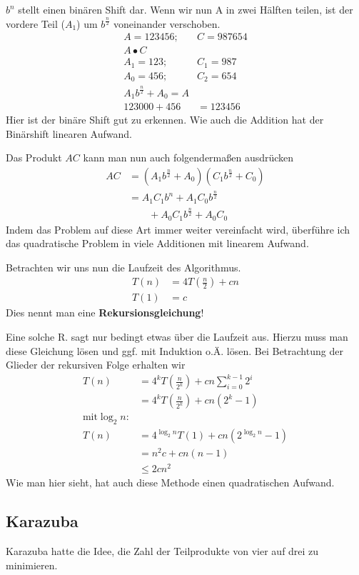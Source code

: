 $b^n$ stellt einen binären Shift dar. Wenn wir nun A in zwei Hälften teilen, ist der vordere Teil ($A_1$) um $b^\frac{n}{2}$ voneinander verschoben.
\begin{eqnarray*}
A=123456;&C=987654\\
A\bullet C&\\
A_1=123;&C_1=987\\
A_0=456;&C_2=654\\
A_1b^\frac{n}{2}+A_0=A\\
123000+456&=123456
\end{eqnarray*}
Hier ist der binäre Shift gut zu erkennen. Wie auch die Addition hat der Binärshift linearen \linebreak Aufwand.

Das Produkt $AC$ kann man nun auch folgendermaßen ausdrücken
\begin{align*}
AC&=(A_1b^{\frac{n}{2}}+A_0)(C_1b^{\frac{n}{2}}+C_0)\\
&=A_1C_1b^n+A_1C_0b^{\frac{n}{2}}\\
&\qquad {}+A_0C_1b^\frac{n}{2}+A_0C_0
\end{align*}
Indem das Problem auf diese Art immer weiter vereinfacht wird, überführe ich das quadratische Problem in viele Additionen mit linearem Aufwand.

Betrachten wir uns nun die Laufzeit des Algorithmus. 
\begin{align*}
T(n)&=4T\left(\frac{n}{2}\right)+cn\\
T(1)&=c
\end{align*}
Dies nennt man eine \textbf{Rekursionsgleichung}!

Eine solche R. sagt nur bedingt etwas über die Laufzeit aus. Hierzu muss man diese Gleichung lösen und ggf. mit Induktion o.Ä. lösen.
Bei Betrachtung der Glieder der rekursiven Folge erhalten wir
\begin{align*}
T(n)&=4^kT\left(\frac{n}{2^k}\right)+cn\sum_{i=0}^{k-1}2^i\\
&=4^kT\left(\frac{n}{2^k}\right)+cn\left(2^k-1\right)\\
\mbox{mit}\log_2n:\\
T(n)&=4^{\log_2n}T(1)+cn\left(2^{\log_2n}-1\right)\\
&=n^2c+cn\left(n-1\right)\\
&\le2cn^2
\end{align*}
Wie man hier sieht, hat auch diese Methode einen quadratischen Aufwand. 

\subsection{Karazuba}
Karazuba hatte die Idee, die Zahl der Teilprodukte von vier auf drei zu minimieren.


